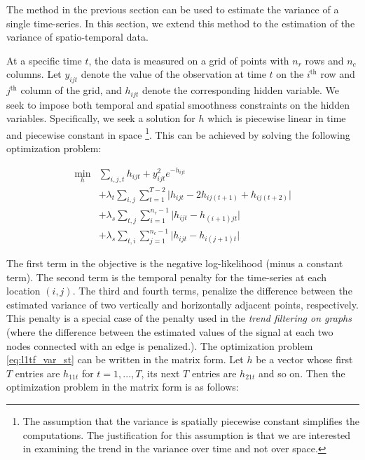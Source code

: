 \documentclass{article}
\begin{document}
The method in the previous section can be used to estimate the variance of a single time-series. In this section, we extend this method to the estimation of the variance of spatio-temporal data.

At a specific time $t$, the data is measured on a grid of points with $n_r$ rows and $n_c$ columns. Let $y_{ijt}$ denote the value of the observation at time $t$ on the $i^\text{th}$ row and $j^\text{th}$ column of the grid, and $h_{ijt}$ denote the corresponding hidden variable. We seek to impose both temporal and spatial smoothness constraints on the hidden variables. Specifically, we seek a solution for $h$ which is piecewise linear in time and piecewise constant in space \footnote{The assumption that the variance is spatially piecewise constant simplifies the computations. The justification for this assumption is that we are interested in examining the trend in the variance over time and not over space.}. This can be achieved by solving the following optimization problem:

\begin{equation}
\begin{aligned}
\min_h &\sum_{i,j,t}h_{ijt}+y_{ijt}^2e^{-h_{ijt}}\\
&+\lambda_t \sum_{i,j} \sum_{t=1}^{T-2} \big|h_{ijt}-2h_{ij(t+1)}+h_{ij(t+2)}\big|\\
&+\lambda_s \sum_{t,j} \sum_{i=1}^{n_r-1} \big|h_{ijt}-h_{(i+1)jt}\big|\\
&+\lambda_s \sum_{t,i} \sum_{j=1}^{n_c-1} \big|h_{ijt}-h_{i(j+1)t}\big|
\end{aligned}
\label{eq:l1tf_var_st}
\end{equation}

The first term in the objective is the negative log-likelihood (minus a constant term). The second term is the temporal penalty for the time-series at each location $(i,j)$. The third and fourth terms, penalize the difference between the estimated variance of two vertically and horizontally adjacent points, respectively. This penalty is a special case of the penalty used in the \textit{trend filtering on graphs }\citep{wang_trend_2016} (where the difference between the estimated values of the signal at each two nodes connected with an edge is penalized.). The optimization problem \eqref{eq:l1tf_var_st} can be written in the matrix form. Let $h$ be a vector whose first $T$ entries are $h_{11t}$ for $t=1,...,T$, its next $T$ entries are $h_{21t}$ and so on. Then the optimization problem in the matrix form is as follows:
\end{document}
